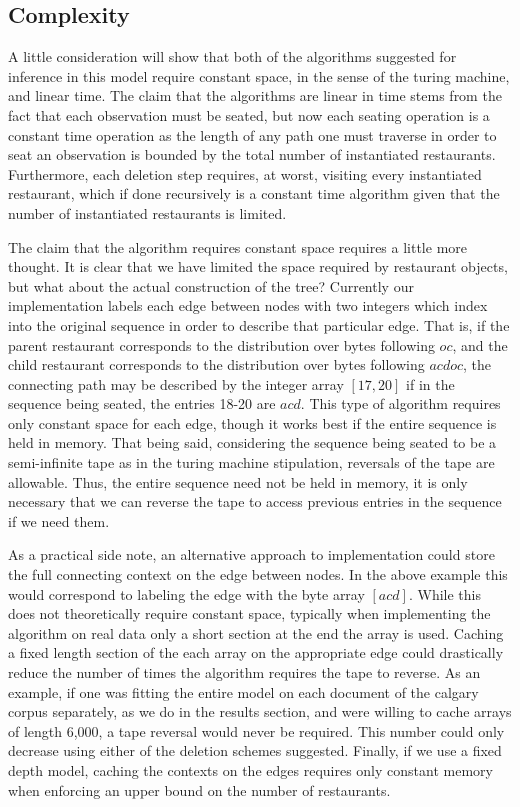 \subsection{Complexity}

A little consideration will show that both of the algorithms suggested for inference in this model require constant space, in the sense of the turing machine, and linear time.  The claim that the algorithms are linear in time stems from the fact that each observation must be seated, but now each seating operation is a constant time operation as the length of any path one must traverse in order to seat an observation is bounded by the total number of instantiated restaurants.  Furthermore, each deletion step requires, at worst, visiting every instantiated restaurant, which if done recursively is a constant time algorithm given that the number of instantiated restaurants is limited.  

The claim that the algorithm requires constant space requires a little more thought.  It is clear that we have limited the space required by restaurant objects, but what about the actual construction of the tree?  Currently our implementation labels each edge between nodes with two integers which index into the original sequence in order to describe that particular edge.  That is, if the parent restaurant corresponds to the distribution over bytes following $oc$,  and the child restaurant corresponds to the distribution over bytes following $acdoc$, the connecting path may be described by the integer array $[17,20]$ if in the sequence being seated, the entries 18-20 are $acd$.  This type of algorithm requires only constant space for each edge, though it works best if the entire sequence is held in memory.  That being said, considering the sequence being seated to be a semi-infinite tape as in the turing machine stipulation, reversals of the tape are allowable.  Thus, the entire sequence need not be held in memory, it is only necessary that we can reverse the tape to access previous entries in the sequence if we need them.

As a practical side note, an alternative approach to implementation could store the full connecting context on the edge between nodes.  In the above example this would correspond to labeling the edge with the byte array $[acd]$.  While this does not theoretically require constant space, typically when implementing the algorithm on real data only a short section at the end the array is used.  Caching a fixed length section of the each array on the appropriate edge could drastically reduce the number of times the algorithm requires the tape to reverse.  As an example, if one was fitting the entire model on each document of the calgary corpus separately, as we do in the results section, and were willing to cache arrays of length 6,000, a tape reversal would never be required.  This number could only decrease using either of the deletion schemes suggested.  Finally, if we use a fixed depth model, caching the contexts on the edges requires only constant memory when enforcing an upper bound on the number of restaurants.
